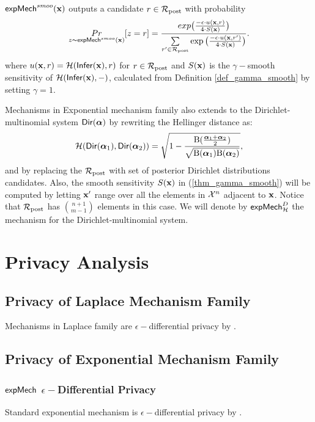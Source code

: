 \documentclass{article}
\begin{document}
 
\begin{definition}
\label{def_smoo_2}
$\mathsf{expMech}^{smoo}(\textbf{x})$ outputs a candidate $r \in \mathcal{R}_{\textup{post}}$ with probability
\begin{equation*}
  \underset{z \thicksim \mathsf{expMech}^{smoo}(\textbf{x})}{Pr}[z = r] = \frac {exp\big(\frac{-\epsilon\cdot u(\textbf{x}, {r})}{4\cdot S(\textbf{x})}\big)}
{\sum\limits_{r'\in \mathcal{R}_{\textup{post}}} \exp \big(\frac{-\epsilon\cdot u(\textbf{x}, r')}{4 \cdot S(\textbf{x})}\big)}.
\end{equation*}
where $u(\textbf{x}, {r}) = \mathcal{H}(\mathsf{Infer}(\textbf{x}),r)$ for $r \in \mathcal{R}_{\textup{post}}$ and $S(\textbf{x})$ is the $\gamma -$smooth sensitivity of $\mathcal{H}(\mathsf{Infer}(\textbf{x}),-)$, calculated from Definition \ref{def_gamma_smooth} by setting $\gamma = 1$.
\end{definition}
Mechanisms in Exponential mechanism family also extends to the Dirichlet-multinomial system $\mathsf{Dir}(\boldsymbol{\alpha})$ by rewriting the Hellinger distance as:
\[
  \mathcal{H}(\mathsf{Dir}(\boldsymbol{\alpha}_1), \mathsf{Dir}(\boldsymbol{\alpha}_2)) = \sqrt{1 - \frac{\textup{B}(\frac{\boldsymbol{\alpha}_1 + \boldsymbol{\alpha}_2}{2})}{\sqrt{\textup{B}(\boldsymbol{\alpha}_1) \textup{B}(\boldsymbol{\alpha}_2)}}},
\]
and by replacing the $\mathcal{R}_{\textup{post}}$ with set of posterior Dirichlet
distributions candidates. Also, the smooth sensitivity $S(\textbf{x})$
in (\ref{thm_gamma_smooth}) will be computed by letting $\textbf{x}'$ range
over all the elements in $\mathcal{X}^{n}$ adjacent to $\textbf{x}$. Notice
that $\mathcal{R}_{\textup{post}}$ has $\binom{n + 1}{m - 1}$ elements in this case. We
will denote by $\mathsf{expMech}^{D}_{\mathcal{H}}$ the mechanism for the
Dirichlet-multinomial system.


\section{Privacy Analysis}

\subsection{Privacy of Laplace Mechanism Family}
Mechanisms in Laplace family are $\epsilon-$differential privacy by \cite{dwork2014algorithmic}.

\subsection{Privacy of Exponential Mechanism Family}
\subsubsection{$\mathsf{expMech}$ $\epsilon-$Differential Privacy}
Standard exponential mechanism is $\epsilon-$differential privacy by \cite{dwork2014algorithmic}.
\end{document}
